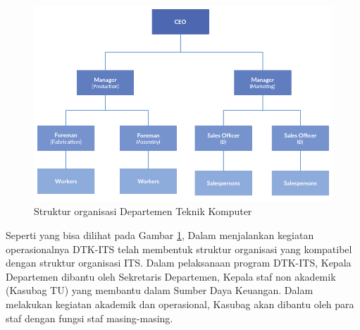 \begin{figure} [ht] \centering
  \includegraphics[scale=0.4]{gambar/organization-structure.png}
  \caption{Struktur organisasi Departemen Teknik Komputer}
  \label{fig:OrganizationStructure}
\end{figure}

Seperti yang bisa dilihat pada Gambar \ref{fig:OrganizationStructure}, Dalam menjalankan kegiatan operasionalnya DTK-ITS telah membentuk struktur organisasi yang kompatibel dengan struktur organisasi ITS. Dalam pelaksanaan program DTK-ITS, Kepala Departemen dibantu oleh Sekretaris Departemen, Kepala staf non akademik (Kasubag TU) yang membantu dalam Sumber Daya Keuangan. Dalam melakukan kegiatan akademik dan operasional, Kasubag akan dibantu oleh para staf dengan fungsi staf masing-masing.
